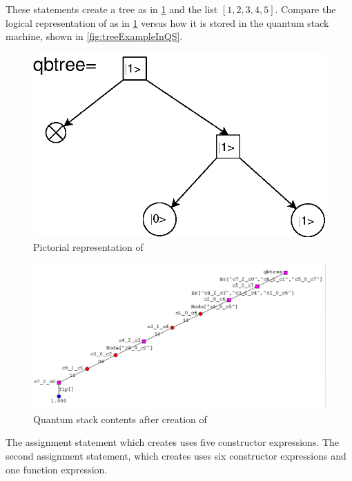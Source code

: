 These statements create a tree as in \ref{fig:treeExample} and 
the list $[1,2,3,4,5]$. Compare the logical representation of
 as in \ref{fig:treeExample} versus how it is stored
in the quantum stack machine, shown in \vref{fig:treeExampleInQS}.
\begin{figure}[htbp]
\begin{center}
\includegraphics[scale=.6]{images/treeExample.eps}
\end{center}
\caption{Pictorial representation of }\label{fig:treeExample}
\end{figure}
\begin{figure}[htbp]
\begin{center}
\includegraphics[scale=.5]{images/treeExampleInQS.eps}
\end{center}
\caption{Quantum stack contents after creation of }\label{fig:treeExampleInQS}
\end{figure}
The assignment statement which creates  uses five constructor
expressions. The second assignment statement, which creates 
 uses six constructor expressions and one function expression.

